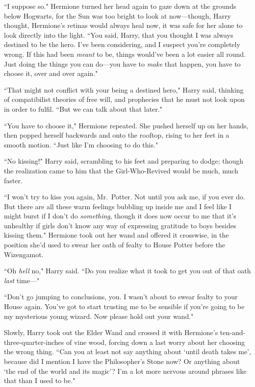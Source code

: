 ``I suppose so." Hermione turned her head again to gaze down at the grounds below Hogwarts, for the Sun was too bright to look at now---though, Harry thought, Hermione's retinas would always heal now, it was safe for her alone to look directly into the light. ``You said, Harry, that you thought I was always destined to be the hero. I've been considering, and I suspect you're completely wrong. If this had been \emph{meant} to be, things would've been a lot easier all round. Just doing the things you can do---you have to \emph{make} that happen, you have to choose it, over and over again."

``That might not conflict with your being a destined hero," Harry said, thinking of compatibilist theories of free will, and prophecies that he must not look upon in order to fulfil. ``But we can talk about that later."

``You have to choose it," Hermione repeated. She pushed herself up on her hands, then popped herself backwards and onto the rooftop, rising to her feet in a smooth motion. ``Just like I'm choosing to do this."

``No kissing!" Harry said, scrambling to his feet and preparing to dodge; though the realization came to him that the Girl-Who-Revived would be much, much faster.

``I won't try to kiss you again, Mr.~Potter. Not until you ask me, if you ever do. But there are all these warm feelings bubbling up inside me and I feel like I might burst if I don't do \emph{something}, though it does now occur to me that it's unhealthy if girls don't know any way of expressing gratitude to boys besides kissing them." Hermione took out her wand and offered it crosswise, in the position she'd used to swear her oath of fealty to House Potter before the Wizengamot.

``Oh \emph{hell} no," Harry said. ``Do you realize what it took to get you out of that oath \emph{last} time---"

``Don't go jumping to conclusions, you. I wasn't about to swear fealty to your House again. You've got to start trusting me to be sensible if you're going to be my mysterious young wizard. Now please hold out your wand."

Slowly, Harry took out the Elder Wand and crossed it with Hermione's ten-and-three-quarter-inches of vine wood, forcing down a last worry about her choosing the wrong thing. ``Can you at least not say anything about `until death takes me', because did I mention I have the Philosopher's Stone now? Or anything about `the end of the world and its magic'? I'm a lot more nervous around phrases like that than I used to be."

